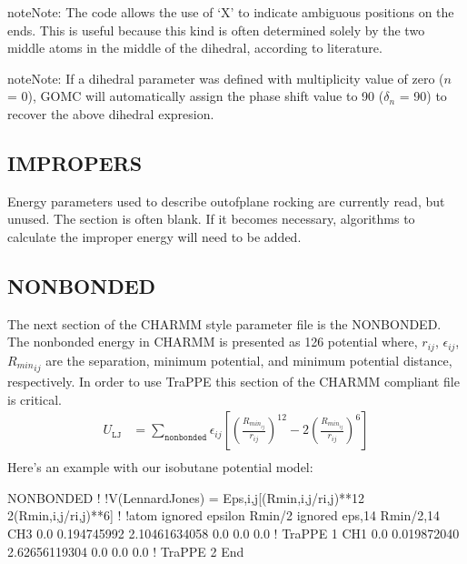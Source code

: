 \documentclass[letterpaper,10pt,english]{sphinxmanual}
\begin{document}
\begin{sphinxadmonition}{note}{Note:}
The code allows the use of ‘X’ to indicate ambiguous positions on the ends. This is useful because this kind is often determined solely by the two middle atoms in the middle of the dihedral, according to literature.
\end{sphinxadmonition}

\begin{sphinxadmonition}{note}{Note:}
If a dihedral parameter was defined with multiplicity value of zero (\(n\) = 0), GOMC will automatically assign the phase shift value to 90 (\(\delta_n\) = 90) to recover the above dihedral expresion.
\end{sphinxadmonition}


\subsection{IMPROPERS}
\label{\detokenize{input_file:impropers}}
Energy parameters used to describe out\sphinxhyphen{}of\sphinxhyphen{}plane rocking are currently read, but unused. The section is often blank. If it becomes necessary, algorithms to calculate the improper energy will need to be added.


\subsection{NONBONDED}
\label{\detokenize{input_file:nonbonded}}
The next section of the CHARMM style parameter file is the NONBONDED. The nonbonded energy in CHARMM is presented as 12\sphinxhyphen{}6 potential
where, \(r_{ij}\), \(\epsilon_{ij}\), \({R_{min}}_{ij}\) are the separation, minimum potential, and minimum potential distance, respectively.
In order to use TraPPE this section of the CHARMM compliant file is critical.
\begin{equation*}
\begin{split}U_{\texttt{LJ}}&=\sum_{\texttt{nonbonded}} \epsilon_{ij}\left[\left(\frac{R_{min_{ij}}}{r_{ij}}\right)^{12}-2\left(\frac{R_{min_{ij}}}{r_{ij}}\right)^6\right] \\\end{split}
\end{equation*}
Here’s an example with our isobutane potential model:

\begin{sphinxVerbatim}[commandchars=\\\{\}]
NONBONDED
!
!V(Lennard\PYGZhy{}Jones) = Eps,i,j[(Rmin,i,j/ri,j)**12 \PYGZhy{} 2(Rmin,i,j/ri,j)**6]
!
!atom ignored epsilon         Rmin/2        ignored   eps,1\PYGZhy{}4     Rmin/2,1\PYGZhy{}4
CH3   0.0     \PYGZhy{}0.194745992  2.10461634058     0.0       0.0       0.0 !  TraPPE 1
CH1   0.0     \PYGZhy{}0.019872040  2.62656119304     0.0       0.0       0.0 !  TraPPE 2
End
\end{sphinxVerbatim}
\end{document}
